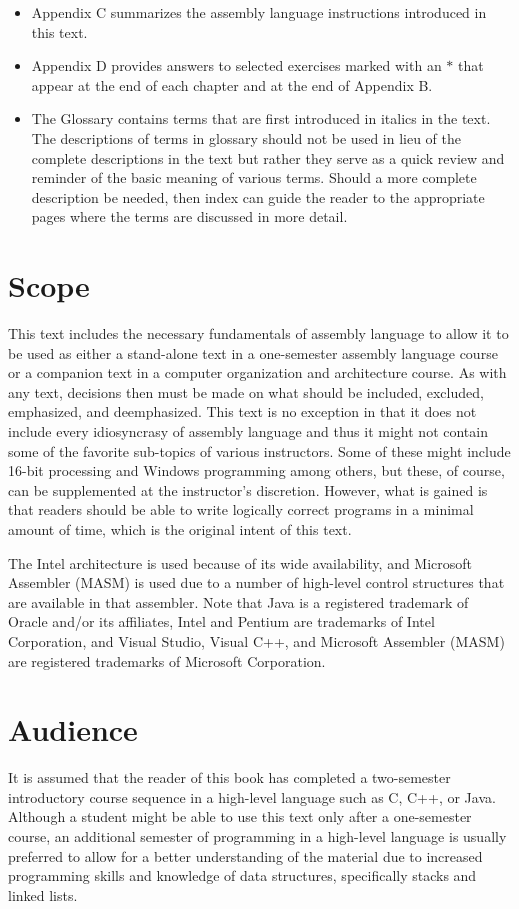 \documentclass[10pt]{book}
\begin{document}
\begin{itemize}
  \item Appendix C summarizes the assembly language instructions introduced in this text.
  \item Appendix D provides answers to selected exercises marked with an $*$ that appear at the end of each chapter and at the end of Appendix B.
  \item The Glossary contains terms that are first introduced in italics in the text. The descriptions of terms in glossary should not be used in lieu of the complete descriptions in the text but rather they serve as a quick review and reminder of the basic meaning of various terms. Should a more complete description be needed, then index can guide the reader to the appropriate pages where the terms are discussed in more detail.
\end{itemize}


\section*{Scope}
This text includes the necessary fundamentals of assembly language to allow it to be used as either a stand-alone text in a one-semester assembly language course or a companion text in a computer organization and architecture course. As with any text, decisions then must be made on what should be included, excluded, emphasized, and deemphasized. This text is no exception in that it does not include every idiosyncrasy of assembly language and thus it might not contain some of the favorite sub-topics of various instructors. Some of these might include 16-bit processing and Windows programming among others, but these, of course, can be supplemented at the instructor's discretion. However, what is gained is that readers should be able to write logically correct programs in a minimal amount of time, which is the original intent of this text.


The Intel architecture is used because of its wide availability, and Microsoft Assembler (MASM) is used due to a number of high-level control structures that are available in that assembler. Note that Java is a registered trademark of Oracle and/or its affiliates, Intel and Pentium are trademarks of Intel Corporation, and Visual Studio, Visual C++, and Microsoft Assembler (MASM) are registered trademarks of Microsoft Corporation.

\section*{Audience}
It is assumed that the reader of this book has completed a two-semester introductory course sequence in a high-level language such as C, C++, or Java. Although a student might be able to use this text only after a one-semester course, an additional semester of programming in a high-level language is usually preferred to allow for a better understanding of the material due to increased programming skills and knowledge of data structures, specifically stacks and linked lists.
\end{document}

